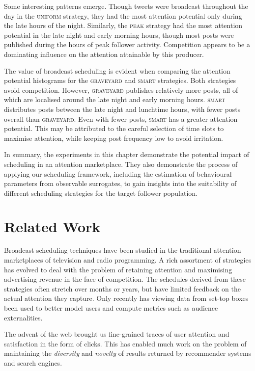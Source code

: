 \documentclass[onesided,asymmetric]{tufte-book}
\begin{document}
Some interesting patterns emerge. Though tweets were broadcast throughout the day in the \textsc{uniform} strategy, they had the most attention potential only during the late hours of the night. Similarly, the \textsc{peak} strategy had the most attention potential in the late night and early morning hours, though most posts were published during the hours of peak follower activity. Competition appears to be a dominating influence on the attention attainable by this producer.

The value of broadcast scheduling is evident when comparing the attention potential histograms for the \textsc{graveyard} and \textsc{smart} strategies. Both strategies avoid competition. However, \textsc{graveyard} publishes relatively more posts, all of which are localised around the late night and early morning hours. \textsc{smart} distributes posts between the late night and lunchtime hours, with fewer posts overall than \textsc{graveyard}. Even with fewer posts, \textsc{smart} has a greater attention potential. This may be attributed to the careful selection of time slots to maximise attention, while keeping post frequency low to avoid irritation.

In summary, the experiments in this chapter demonstrate the potential impact of scheduling in an attention marketplace. They also demonstrate the process of applying our scheduling framework, including the estimation of behavioural parameters from observable surrogates, to gain insights into the suitability of different scheduling strategies for the target follower population.

\chapter{Related Work}
\label{ch:related-work}

Broadcast scheduling techniques have been studied in the traditional attention marketplaces of television and radio programming\cite{eastman2012media}\cite{vane1994programming}. A rich assortment of strategies has evolved to deal with the problem of retaining attention and maximising advertising revenue in the face of competition. The schedules derived from these strategies often stretch over months or years, but have limited feedback on the actual attention they capture. Only recently has viewing data from set-top boxes been used to better model users and compute metrics such as audience externalities\cite{wilbur2013audience}.

The advent of the web brought us fine-grained traces of user attention and satisfaction in the form of clicks. This has enabled much work on the problem of maintaining the \textit{diversity} and \textit{novelty} of results returned by recommender systems\cite{Ziegler:2005:IRL:1060745.1060754} and search engines\cite{Agrawal:2009:DSR:1498759.1498766}.
\end{document}
